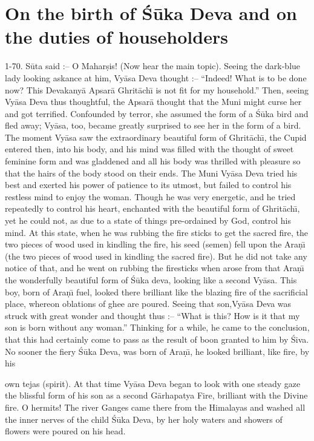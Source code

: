 \chapter{On the birth of \'S\=uka Deva and on the duties of householders}

1-70. S\=uta said :-- O Mahar\d{s}is! (Now hear the main topic). Seeing the dark-blue lady looking askance at him, Vy\=asa Deva thought :-- ``Indeed! What is to be done now? This Devakany\=a Apsar\=a Ghrit\=ach\={\i} is not fit for my household.'' Then, seeing Vy\=asa Deva thus thoughtful, the Apsar\=a thought that the Muni might curse her and got terrified. Confounded by terror, she assumed the form of a \'S\=uka bird and fled away; Vy\=asa, too, became greatly surprised to see her in the form of a bird. The moment Vy\=asa saw the extraordinary beautiful form of Ghrit\=ach\={\i}, the Cupid entered then, into his body, and his mind was filled with the thought of sweet feminine form and was gladdened and all his body was thrilled with pleasure so that the hairs of the body stood on their ends. The Muni Vy\=asa Deva tried his best and exerted his power of patience to its utmost, but failed to control his restless mind to enjoy the woman. Though he was very energetic, and he tried repeatedly to control his heart, enchanted with the beautiful form of Ghrit\=ach\={\i}, yet he could not, as due to a state of things pre-ordained by God, control his mind. At this state, when he was rubbing the fire sticks to get the sacred fire, the two pieces of wood used in kindling the fire, his seed (semen) fell upon the Ara\d{n}\={\i} (the two pieces of wood used in kindling the sacred fire). But he did not take any notice of that, and he went on rubbing the firesticks when arose from that Ara\d{n}\={\i} the wonderfully beautiful form of \'S\=uka deva, looking like a second Vy\=asa. This boy, born of Ara\d{n}\={\i} fuel, looked there brilliant like the blazing fire of the sacrificial place, whereon oblations of ghee are poured. Seeing that son,Vy\=asa Deva was struck with great wonder and thought thus :-- ``What is this? How is it that my son is born without any woman.'' Thinking for a while, he came to the conclusion, that this had certainly come to pass as the result of boon granted to him by \'Siva. No sooner the fiery \'S\=uka Deva, was born of Ara\d{n}\={\i}, he looked brilliant, like fire, by his

own tejas (spirit). At that time Vy\=asa Deva began to look with one steady gaze the blissful form of his son as a second G\=arhapatya Fire, brilliant with the Divine fire. O hermits! The river Ganges came there from the Himalayas and washed all the inner nerves of the child \'S\=uka Deva, by her holy waters and showers of flowers were poured on his head.

